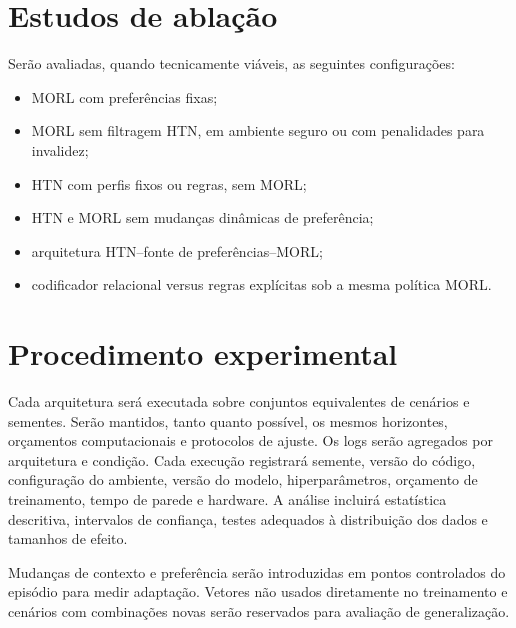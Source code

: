 \section{Estudos de ablação}

Serão avaliadas, quando tecnicamente viáveis, as seguintes configurações:

\begin{itemize}
\item MORL com preferências fixas;
\item MORL sem filtragem HTN, em ambiente seguro ou com penalidades para invalidez;
\item HTN com perfis fixos ou regras, sem MORL;
\item HTN e MORL sem mudanças dinâmicas de preferência;
\item arquitetura HTN--fonte de preferências--MORL;
\item codificador relacional versus regras explícitas sob a mesma política MORL.
\end{itemize}

\section{Procedimento experimental}

Cada arquitetura será executada sobre conjuntos equivalentes de cenários e
sementes.
Serão mantidos, tanto quanto possível, os mesmos horizontes, orçamentos
computacionais e protocolos de ajuste.
Os logs serão agregados por arquitetura e condição.
Cada execução registrará semente, versão do código, configuração do ambiente,
versão do modelo, hiperparâmetros, orçamento de treinamento, tempo de parede
e hardware.
A análise incluirá estatística descritiva, intervalos de confiança, testes
adequados à distribuição dos dados e tamanhos de efeito.

Mudanças de contexto e preferência serão introduzidas em pontos controlados do
episódio para medir adaptação.
Vetores não usados diretamente no treinamento e cenários com combinações novas
serão reservados para avaliação de generalização.


